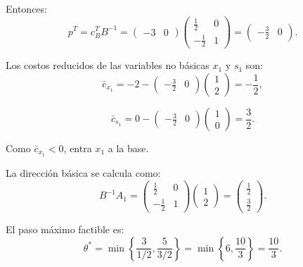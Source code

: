 \begin{enumerate}
Entonces:
\begin{equation}
p^T=c_B^T B^{-1}
=
\begin{pmatrix}
-3 & 0
\end{pmatrix}
\begin{pmatrix}
\frac{1}{2} & 0\\
-\frac{1}{2} & 1
\end{pmatrix}
=
\begin{pmatrix}
-\frac{3}{2} & 0
\end{pmatrix}.
\end{equation}

Los costos reducidos de las variables no básicas $x_1$ y $s_1$ son:
\begin{equation}
\bar{c}_{x_1}
=
-2-
\begin{pmatrix}
-\frac{3}{2} & 0
\end{pmatrix}
\begin{pmatrix}
1\\
2
\end{pmatrix}
=
-\frac{1}{2},
\end{equation}

\begin{equation}
\bar{c}_{s_1}
=
0-
\begin{pmatrix}
-\frac{3}{2} & 0
\end{pmatrix}
\begin{pmatrix}
1\\
0
\end{pmatrix}
=
\frac{3}{2}.
\end{equation}

Como $\bar{c}_{x_1}<0$, entra $x_1$ a la base.

La dirección básica se calcula como:
\begin{equation}
B^{-1}A_1
=
\begin{pmatrix}
\frac{1}{2} & 0\\
-\frac{1}{2} & 1
\end{pmatrix}
\begin{pmatrix}
1\\
2
\end{pmatrix}
=
\begin{pmatrix}
\frac{1}{2}\\
\frac{3}{2}
\end{pmatrix}.
\end{equation}

El paso máximo factible es:
\begin{equation}
\theta^*
=
\min\left\{
\frac{3}{1/2},
\frac{5}{3/2}
\right\}
=
\min\left\{
6,\frac{10}{3}
\right\}
=
\frac{10}{3}.
\end{equation}


\end{enumerate}
